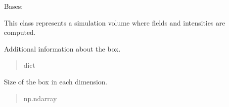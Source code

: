 \documentclass[letterpaper,10pt,english]{sphinxmanual}
\begin{document}
\begin{fulllineitems}
\label{\detokenize{source/Box:Box.Box}}
\pysigstartsignatures
\pysiglinewithargsret
{}
{\sphinxparamcomma {}\sphinxparamcomma {}\sphinxparamcomma {}}
{}
\pysigstopsignatures
\sphinxAtStartPar
Bases: 

\sphinxAtStartPar
This class represents a simulation volume where fields and intensities are computed.

\begin{fulllineitems}
\label{\detokenize{source/Box:Box.Box.info}}
\pysigstartsignatures
\pysigline
{}
\pysigstopsignatures
\sphinxAtStartPar
Additional information about the box.
\begin{quote}\begin{description}
\sphinxAtStartPar
dict

\end{description}\end{quote}

\end{fulllineitems}


\begin{fulllineitems}
\label{\detokenize{source/Box:Box.Box.box_size}}
\pysigstartsignatures
\pysigline
{}
\pysigstopsignatures
\sphinxAtStartPar
Size of the box in each dimension.
\begin{quote}\begin{description}
\sphinxAtStartPar
np.ndarray

\end{description}\end{quote}

\end{fulllineitems}



\end{fulllineitems}
\end{document}
